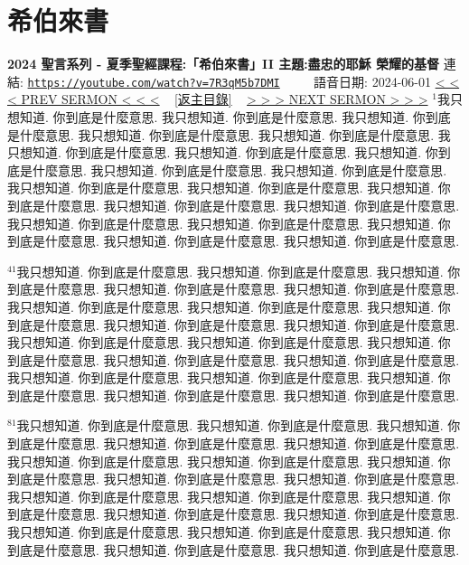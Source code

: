 \documentclass{book}
\begin{document}
\section{希伯來書}
\label{sec:7R3qM5b7DMI}
\textbf{2024 聖言系列 - 夏季聖經課程:「希伯來書」II 主題:盡忠的耶穌 榮耀的基督}
\newline
\newline
連結: \href{https://youtube.com/watch?v=7R3qM5b7DMI}{\texttt{https://youtube.com/watch?v=7R3qM5b7DMI}} ~~~~ 語音日期: 2024-06-01
\newline
\newline
\hyperref[sec:iBfE9eVripQ]{\small{< < < PREV SERMON < < <}}
~
\hyperref[sec:index]{\small{[返主目錄]}}
~
\hyperref[sec:wAbpGBqNgNM]{\small{> > > NEXT SERMON > > >}}
\newline
\newline
$^{1}$我只想知道.
你到底是什麼意思.
我只想知道.
你到底是什麼意思.
我只想知道.
你到底是什麼意思.
我只想知道.
你到底是什麼意思.
我只想知道.
你到底是什麼意思.
我只想知道.
你到底是什麼意思.
我只想知道.
你到底是什麼意思.
我只想知道.
你到底是什麼意思.
我只想知道.
你到底是什麼意思.
我只想知道.
你到底是什麼意思.
我只想知道.
你到底是什麼意思.
我只想知道.
你到底是什麼意思.
我只想知道.
你到底是什麼意思.
我只想知道.
你到底是什麼意思.
我只想知道.
你到底是什麼意思.
我只想知道.
你到底是什麼意思.
我只想知道.
你到底是什麼意思.
我只想知道.
你到底是什麼意思.
我只想知道.
你到底是什麼意思.
我只想知道.
你到底是什麼意思.

$^{41}$我只想知道.
你到底是什麼意思.
我只想知道.
你到底是什麼意思.
我只想知道.
你到底是什麼意思.
我只想知道.
你到底是什麼意思.
我只想知道.
你到底是什麼意思.
我只想知道.
你到底是什麼意思.
我只想知道.
你到底是什麼意思.
我只想知道.
你到底是什麼意思.
我只想知道.
你到底是什麼意思.
我只想知道.
你到底是什麼意思.
我只想知道.
你到底是什麼意思.
我只想知道.
你到底是什麼意思.
我只想知道.
你到底是什麼意思.
我只想知道.
你到底是什麼意思.
我只想知道.
你到底是什麼意思.
我只想知道.
你到底是什麼意思.
我只想知道.
你到底是什麼意思.
我只想知道.
你到底是什麼意思.
我只想知道.
你到底是什麼意思.
我只想知道.
你到底是什麼意思.

$^{81}$我只想知道.
你到底是什麼意思.
我只想知道.
你到底是什麼意思.
我只想知道.
你到底是什麼意思.
我只想知道.
你到底是什麼意思.
我只想知道.
你到底是什麼意思.
我只想知道.
你到底是什麼意思.
我只想知道.
你到底是什麼意思.
我只想知道.
你到底是什麼意思.
我只想知道.
你到底是什麼意思.
我只想知道.
你到底是什麼意思.
我只想知道.
你到底是什麼意思.
我只想知道.
你到底是什麼意思.
我只想知道.
你到底是什麼意思.
我只想知道.
你到底是什麼意思.
我只想知道.
你到底是什麼意思.
我只想知道.
你到底是什麼意思.
我只想知道.
你到底是什麼意思.
我只想知道.
你到底是什麼意思.
我只想知道.
你到底是什麼意思.
我只想知道.
你到底是什麼意思.
\end{document}
